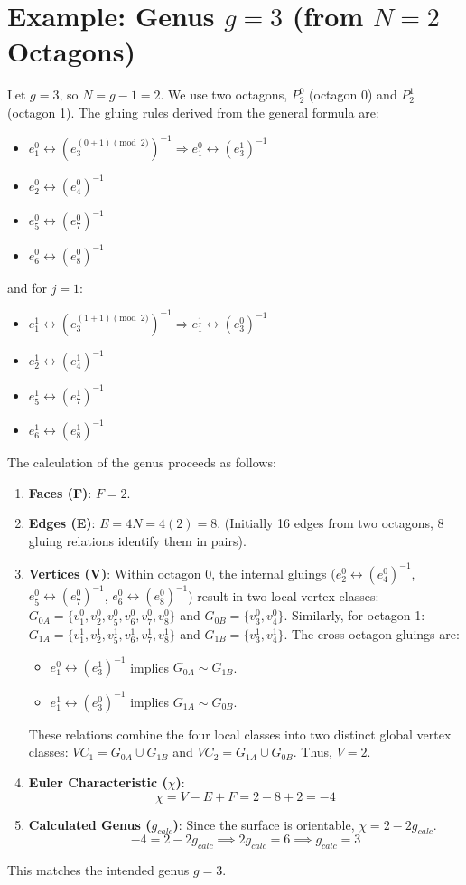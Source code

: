 \documentclass{article}
\theoremstyle{definition}
\theoremstyle{remark}
\begin{document}
\section*{Example: Genus $g=3$ (from $N=2$ Octagons)}
Let $g=3$, so $N=g-1=2$. We use two octagons, $P_2^0$ (octagon 0) and $P_2^1$ (octagon 1). The gluing rules derived from the general formula are:
\begin{itemize}
    \item $e_1^0 \leftrightarrow (e_3^{(0+1)\pmod 2})^{-1} \Rightarrow e_1^0 \leftrightarrow (e_3^1)^{-1}$
    \item $e_2^0 \leftrightarrow (e_4^0)^{-1}$
    \item $e_5^0 \leftrightarrow (e_7^0)^{-1}$
    \item $e_6^0 \leftrightarrow (e_8^0)^{-1}$
\end{itemize}
and for $j=1$:
\begin{itemize}
    \item $e_1^1 \leftrightarrow (e_3^{(1+1)\pmod 2})^{-1} \Rightarrow e_1^1 \leftrightarrow (e_3^0)^{-1}$
    \item $e_2^1 \leftrightarrow (e_4^1)^{-1}$
    \item $e_5^1 \leftrightarrow (e_7^1)^{-1}$
    \item $e_6^1 \leftrightarrow (e_8^1)^{-1}$
\end{itemize}
The calculation of the genus proceeds as follows:
\begin{enumerate}
    \item \textbf{Faces (F)}: $F=2$.
    \item \textbf{Edges (E)}: $E=4N = 4(2) = 8$. (Initially 16 edges from two octagons, 8 gluing relations identify them in pairs).
    \item \textbf{Vertices (V)}:
        Within octagon 0, the internal gluings ($e_2^0 \leftrightarrow (e_4^0)^{-1}$, $e_5^0 \leftrightarrow (e_7^0)^{-1}$, $e_6^0 \leftrightarrow (e_8^0)^{-1}$) result in two local vertex classes: $G_{0A} = \{v_1^0, v_2^0, v_5^0, v_6^0, v_7^0, v_8^0\}$ and $G_{0B} = \{v_3^0, v_4^0\}$.
        Similarly, for octagon 1: $G_{1A} = \{v_1^1, v_2^1, v_5^1, v_6^1, v_7^1, v_8^1\}$ and $G_{1B} = \{v_3^1, v_4^1\}$.
        The cross-octagon gluings are:
        \begin{itemize}
            \item $e_1^0 \leftrightarrow (e_3^1)^{-1}$ implies $G_{0A} \sim G_{1B}$.
            \item $e_1^1 \leftrightarrow (e_3^0)^{-1}$ implies $G_{1A} \sim G_{0B}$.
        \end{itemize}
        These relations combine the four local classes into two distinct global vertex classes: $VC_1 = G_{0A} \cup G_{1B}$ and $VC_2 = G_{1A} \cup G_{0B}$.
        Thus, $V=2$.
    \item \textbf{Euler Characteristic ($\chi$)}:
    $$ \chi = V - E + F = 2 - 8 + 2 = -4 $$
    \item \textbf{Calculated Genus ($g_{calc}$)}:
    Since the surface is orientable, $\chi = 2 - 2g_{calc}$.
    $$ -4 = 2 - 2g_{calc} \implies 2g_{calc} = 6 \implies g_{calc} = 3 $$
\end{enumerate}
This matches the intended genus $g=3$.
\end{document}
